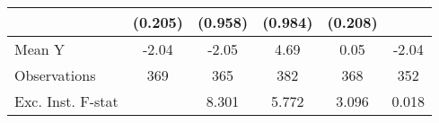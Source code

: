 {\begin{tabular}{l*{5}{c}}
            &     (0.205)         &     (0.958)         &     (0.984)         &     (0.208)         &                     \\
\midrule
Mean Y      &       -2.04         &       -2.05         &        4.69         &        0.05         &       -2.04         \\
Observations&         369         &         365         &         382         &         368         &         352         \\
Exc. Inst. F-stat&                     &       8.301         &       5.772         &       3.096         &       0.018         \\
\bottomrule
\end{tabular}
}
